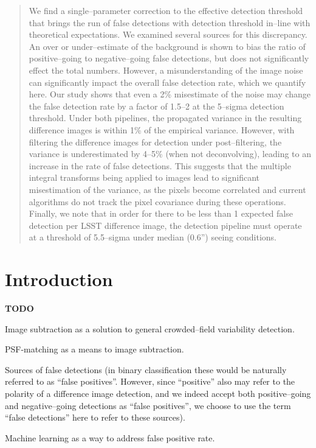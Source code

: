 \documentclass[floatfix, apj]{emulateapj}
\begin{document}
\begin{abstract}
We find a single--parameter correction to the effective detection threshold that brings the run of false detections with detection threshold in--line with theoretical expectations.
We examined several sources for this discrepancy.
An over or under--estimate of the background is shown to bias the ratio of positive--going to negative--going false detections, but does not significantly effect the total numbers.
However, a misunderstanding of the image noise can significantly impact the overall false detection rate, which we quantify here.
Our study shows that even a 2\% misestimate of the noise may change the false detection rate by a factor of 1.5--2 at the 5--sigma detection threshold.
Under both pipelines, the propagated variance in the resulting difference images is within 1\% of the empirical variance.
However, with filtering the difference images for detection under post--filtering, the variance is underestimated by 4--5\% (when not deconvolving), leading to an increase in the rate of false detections.
This suggests that the multiple integral transforms being applied to images lead to significant misestimation of the variance, as the pixels become correlated and current algorithms do not track the pixel covariance during these operations.
Finally, we note that in order for there to be less than 1 expected false detection per LSST difference image, the detection pipeline must operate at a threshold of 5.5--sigma under median (0.6'') seeing conditions.

\end{abstract}

\section{Introduction}

{\bf TODO}

Image subtraction as a solution to general crowded--field variability detection.

PSF-matching as a means to image subtraction.

Sources of false detections (in binary classification these would be naturally referred to as ``false positives''.  However, since ``positive'' also may refer to the polarity of a difference image detection, and we indeed accept both positive--going and negative--going detections as ``false positives'', we choose to use the term ``false detections'' here to refer to these sources).

Machine learning as a way to address false positive rate.
\end{document}
